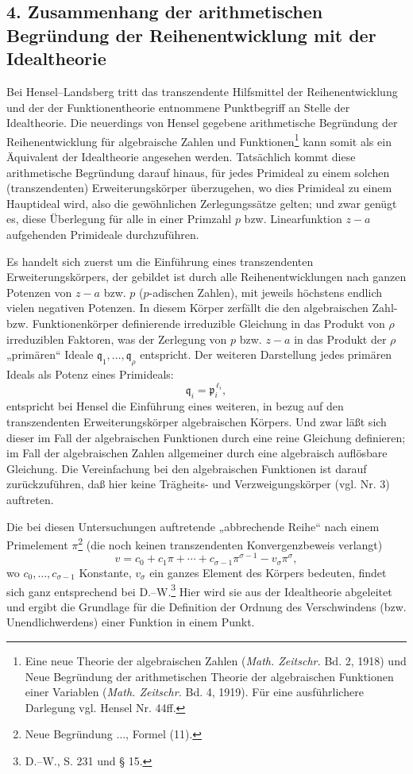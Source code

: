 \documentclass[11pt]{article}
\providecommand{\frp}{\mathfrak p}
\begin{document}
\subsection*{4. Zusammenhang der arithmetischen Begründung der Reihenentwicklung mit der Idealtheorie}
Bei Hensel--Landsberg tritt das transzendente Hilfsmittel der Reihenentwicklung und der der Funktionentheorie entnommene Punktbegriff an Stelle der Idealtheorie. Die neuerdings von Hensel gegebene arithmetische Begründung der Reihenentwicklung für algebraische Zahlen und Funktionen\footnote{Eine neue Theorie der algebraischen Zahlen (\emph{Math. Zeitschr.} Bd. 2, 1918) und Neue Begründung der arithmetischen Theorie der algebraischen Funktionen einer Variablen (\emph{Math. Zeitschr.} Bd. 4, 1919). Für eine ausführlichere Darlegung vgl. Hensel Nr. 44ff.} kann somit als ein Äquivalent der Idealtheorie angesehen werden. Tatsächlich kommt diese arithmetische Begründung darauf hinaus, für jedes Primideal zu einem solchen (transzendenten) Erweiterungskörper überzugehen, wo dies Primideal zu einem Hauptideal wird, also die gewöhnlichen Zerlegungssätze gelten; und zwar genügt es, diese Überlegung für alle in einer Primzahl \(p\) bzw. Linearfunktion \(z-a\) aufgehenden Primideale durchzuführen.

Es handelt sich zuerst um die Einführung eines transzendenten Erweiterungskörpers, der gebildet ist durch alle Reihenentwicklungen nach ganzen Potenzen von \(z-a\) bzw. \(p\) (\(p\)-adischen Zahlen), mit jeweils höchstens endlich vielen negativen Potenzen. In diesem Körper zerfällt die den algebraischen Zahl- bzw. Funktionenkörper definierende irreduzible Gleichung in das Produkt von \(\rho\) irreduziblen Faktoren, was der Zerlegung von \(p\) bzw. \(z-a\) in das Produkt der \(\rho\) „primären“ Ideale \(\mathfrak q_1,\ldots,\mathfrak q_\rho\) entspricht. Der weiteren Darstellung jedes primären Ideals als Potenz eines Primideals:
\[
\mathfrak q_i=\frp_i^{\,\ell_i},
\]
entspricht bei Hensel die Einführung eines weiteren, in bezug auf den transzendenten Erweiterungskörper algebraischen Körpers. Und zwar läßt sich dieser im Fall der algebraischen Funktionen durch eine reine Gleichung definieren; im Fall der algebraischen Zahlen allgemeiner durch eine algebraisch auflösbare Gleichung. Die Vereinfachung bei den algebraischen Funktionen ist darauf zurückzuführen, daß hier keine Trägheits- und Verzweigungskörper (vgl. Nr. 3) auftreten.

Die bei diesen Untersuchungen auftretende „abbrechende Reihe“ nach einem Primelement \(\pi\)\footnote{Neue Begründung \(\ldots\), Formel (11).} (die noch keinen transzendenten Konvergenzbeweis verlangt)
\[
v=c_0+c_1\pi+\cdots+c_{\sigma-1}\pi^{\sigma-1}-v_\sigma\pi^\sigma,
\]
wo \(c_0,\ldots,c_{\sigma-1}\) Konstante, \(v_\sigma\) ein ganzes Element des Körpers bedeuten, findet sich ganz entsprechend bei D.--W.\footnote{D.--W., S. 231 und § 15.} Hier wird sie aus der Idealtheorie abgeleitet und ergibt die Grundlage für die Definition der Ordnung des Verschwindens (bzw. Unendlichwerdens) einer Funktion in einem Punkt.
\end{document}
